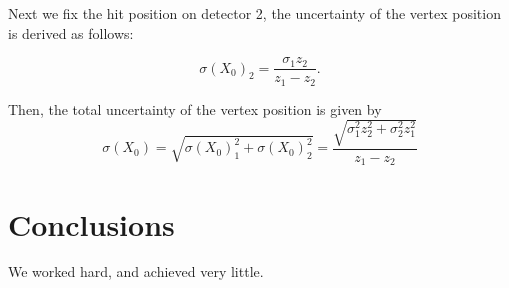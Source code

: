 \documentclass[12pt]{article}
\begin{document}
Next we fix the hit position on detector 2, the uncertainty of the vertex position is derived as follows:

\[
\sigma(X_0)_2 = \frac{\sigma_1z_2}{z_1 - z_2}.
\]

Then, the total uncertainty of the vertex position is given by 
\[
\sigma(X_0) = \sqrt{\sigma(X_0)_1^2+\sigma(X_0)_2^2} = \frac{\sqrt{\sigma_1^2z_2^2+\sigma_2^2z_1^2}} {z_1 - z_2} 
\]


\section{Conclusions}\label{conclusions}
We worked hard, and achieved very little.

%
%
\end{document}
